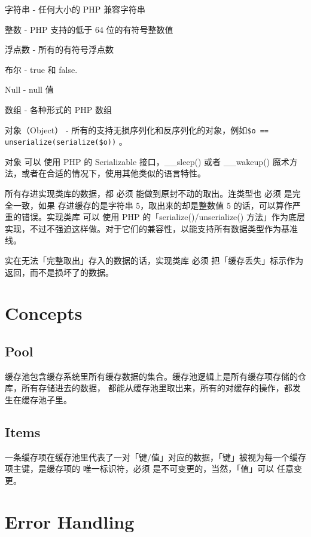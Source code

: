 \begin{compactitem}
\item 字符串 - 任何大小的 PHP 兼容字符串
\item 整数 - PHP 支持的低于 64 位的有符号整数值
\item 浮点数 - 所有的有符号浮点数
\item 布尔 - true 和 false.
\item Null - null 值
\item 数组 - 各种形式的 PHP 数组
\item 对象（Object） - 所有的支持无损序列化和反序列化的对象，例如\texttt{\$o == unserialize(serialize(\$o))} 。

对象 可以 使用 PHP 的 Serializable 接口，\_\_sleep() 或者 \_\_wakeup() 魔术方法，或者在合适的情况下，使用其他类似的语言特性。
\end{compactitem}

所有存进实现类库的数据，都 必须 能做到原封不动的取出。连类型也 必须 是完全一致，如果 存进缓存的是字符串 5，取出来的却是整数值 5 的话，可以算作严重的错误。实现类库 可以 使用 PHP 的「serialize()/unserialize() 方法」作为底层实现，不过不强迫这样做。对于它们的兼容性，以能支持所有数据类型作为基准线。

实在无法「完整取出」存入的数据的话，实现类库 必须 把「缓存丢失」标示作为返回，而不是损坏了的数据。

\section{Concepts}

\subsection{Pool}

缓存池包含缓存系统里所有缓存数据的集合。缓存池逻辑上是所有缓存项存储的仓库，所有存储进去的数据， 都能从缓存池里取出来，所有的对缓存的操作，都发生在缓存池子里。

\subsection{Items}

一条缓存项在缓存池里代表了一对「键/值」对应的数据，「键」被视为每一个缓存项主键，是缓存项的 唯一标识符，必须 是不可变更的，当然，「值」可以 任意变更。

\section{Error Handling}

